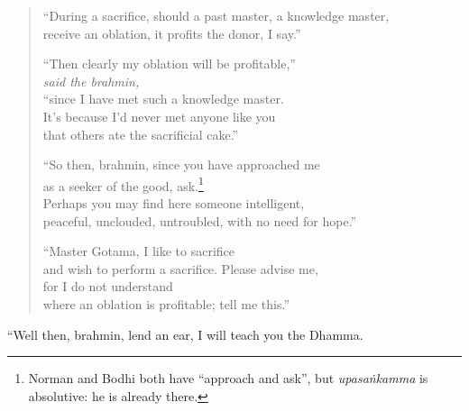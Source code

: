 \documentclass[12pt,openany]{book}%
\newcommand*{\scspeaker}[1]{\hspace{2em}\textit{#1}}
\begin{document}
\begin{verse}
“During a sacrifice, should a past master, a knowledge master, \\
receive an oblation, it profits the donor, I say.” 

“Then clearly my oblation will be profitable,” \\
\scspeaker{said the brahmin, }\\
“since I have met such a knowledge master. \\
It’s because I’d never met anyone like you \\
that others ate the sacrificial cake.” 

“So then, brahmin, since you have approached me \\
as a seeker of the good, ask.\footnote{Norman and Bodhi both have “approach and ask”, but \textit{\textsanskrit{upasaṅkamma}} is absolutive: he is already there. } \\
Perhaps you may find here someone intelligent, \\
peaceful, unclouded, untroubled, with no need for hope.” 

“Master Gotama, I like to sacrifice \\
and wish to perform a sacrifice. Please advise me, \\
for I do not understand \\
where an oblation is profitable; tell me this.” 

%
\end{verse}

“Well then, brahmin, lend an ear, I will teach you the Dhamma. 
\end{document}
